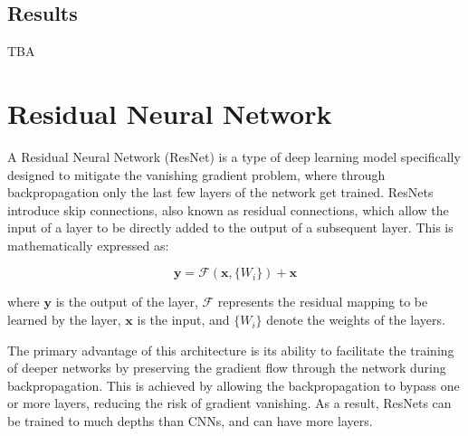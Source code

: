 \subsection{Results}
TBA






\section{Residual Neural Network}


A Residual Neural Network (ResNet) is a type of deep learning model specifically designed to mitigate the vanishing gradient problem, where through backpropagation only the last few layers of the network get trained. ResNets introduce skip connections, also known as residual connections, which allow the input of a layer to be directly added to the output of a subsequent layer. This is mathematically expressed as:

\[
	\mathbf{y} = \mathcal{F}(\mathbf{x}, \{W_i\}) + \mathbf{x}
\]

where $\mathbf{y}$ is the output of the layer, $\mathcal{F}$ represents the residual mapping to be learned by the layer, $\mathbf{x}$ is the input, and $\{W_i\}$ denote the weights of the layers.

The primary advantage of this architecture is its ability to facilitate the training of deeper networks by preserving the gradient flow through the network during backpropagation. This is achieved by allowing the backpropagation to bypass one or more layers, reducing the risk of gradient vanishing. As a result, ResNets can be trained to much depths than CNNs, and can have more layers.





